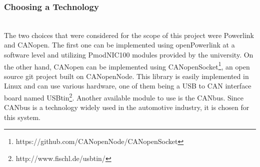 \subsubsection{Choosing a Technology}~\\
The two choices that were considered for the scope of this project were Powerlink and CANopen.
The first one can be implemented using openPowerlink at a software level and utilizing PmodNIC100 modules provided by the university.
On the other hand, CANopen can be implemented using CANopenSocket\footnote{https://github.com/CANopenNode/CANopenSocket}, an open source git project built on CANopenNode.
This library is easily implemented in Linux and can use various hardware, one of them being a USB to CAN interface board named USBtin\footnote{http://www.fischl.de/usbtin/}.
Another available module to use is the CANbus.
Since CANbus is a technology widely used in the automotive industry, it is chosen for this system.
